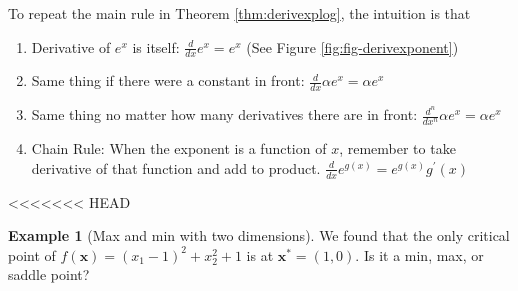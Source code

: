 \documentclass[]{book}
\providecommand{\tightlist}{%
  \setlength{\itemsep}{0pt}\setlength{\parskip}{0pt}}
\theoremstyle{definition}
\theoremstyle{definition}
\newtheorem{example}{Example}[chapter]
\theoremstyle{definition}
\theoremstyle{remark}
\begin{document}
To repeat the main rule in Theorem \ref{thm:derivexplog}, the intuition is that

\begin{enumerate}
\def\labelenumi{\arabic{enumi}.}
\tightlist
\item
  Derivative of \(e^x\) is itself: \(\frac{d}{dx}e^x = e^x\) (See Figure \ref{fig:fig-derivexponent})
\item
  Same thing if there were a constant in front: \(\frac{d}{dx}\alpha e^x = \alpha e^x\)
\item
  Same thing no matter how many derivatives there are in front: \(\frac{d^n}{dx^n} \alpha e^x = \alpha e^x\)
\item
  Chain Rule: When the exponent is a function of \(x\), remember to take derivative of that function and add to product. \(\frac{d}{dx}e^{g(x)}= e^{g(x)} g^\prime(x)\)
\end{enumerate}

<<<<<<< HEAD
\begin{example}[Max and min with two dimensions]
\protect\hypertarget{exm:unnamed-chunk-57}{}{\label{exm:unnamed-chunk-57} {} }
We found that the only critical point of
\(f(\mathbf{x})=(x_1-1)^2+x_2^2+1\) is at \(\mathbf{x}^*=(1,0)\). Is it a min, max, or
saddle point?
\end{example}
\end{document}
